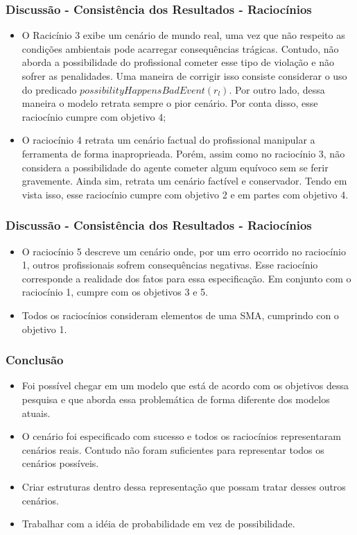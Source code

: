 \documentclass{beamer}
\begin{document}
\begin{frame}
	\frametitle{Discussão - Consistência dos Resultados - Raciocínios}
	\begin{itemize} 
		\item O Racicínio 3 exibe um cenário de mundo real, uma vez que não respeito as condições ambientais pode acarregar consequências trágicas. Contudo, não aborda a possibilidade do profissional cometer esse tipo de violação e não sofrer as penalidades. Uma maneira de corrigir isso consiste considerar o uso do predicado $possibilityHappensBadEvent(r_l)$. Por outro lado, dessa maneira o modelo retrata sempre o pior cenário. Por conta disso, esse raciocínio cumpre com objetivo 4;
		\item O raciocínio 4 retrata um cenário factual do profissional manipular a ferramenta de forma inaproprieada. Porém, assim como no raciocínio 3, não considera a possibilidade do agente cometer algum equívoco sem se ferir gravemente. Ainda sim, retrata um cenário factível e conservador. Tendo em vista isso, esse raciocínio cumpre com objetivo 2 e em partes com objetivo 4. 
	\end{itemize}
\end{frame}

\begin{frame}
	\frametitle{Discussão - Consistência dos Resultados - Raciocínios}
	\begin{itemize} 
		\item O raciocínio 5 descreve um cenário onde, por um erro ocorrido no raciocínio 1, outros profissionais sofrem consequências negativas. Esse raciocínio corresponde a realidade dos fatos para essa especificação. Em conjunto com o raciocínio 1, cumpre com os objetivos 3 e 5.
		\item Todos os raciocínios consideram elementos de uma SMA, cumprindo con o objetivo 1.  
	\end{itemize}
\end{frame}


\begin{frame}
	\frametitle{Conclusão}
	\begin{itemize} 
		\item Foi possível chegar em um modelo que está de acordo com os objetivos dessa pesquisa e que aborda essa problemática de forma diferente dos modelos atuais.
		\item O cenário foi especificado com sucesso e todos os raciocínios representaram cenários reais. Contudo não foram suficientes para representar todos os cenários possíveis.
		\item Criar estruturas dentro dessa representação que possam tratar desses outros cenários. 
		\item Trabalhar com a idéia de probabilidade em vez de possibilidade.   
	\end{itemize}
\end{frame}
\end{document}
